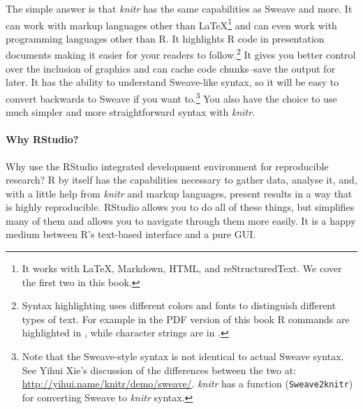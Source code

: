 \documentclass[krantz1]{krantz}
\begin{document}
The simple answer is that {\emph{knitr}} has the same capabilities as Sweave and more. It can work with markup languages other than LaTeX\footnote{It works with LaTeX, Markdown, HTML, and reStructuredText. We cover the first two in this book.} and can even work with programming languages other than R. It highlights R code in presentation documents making it easier for your readers to follow.\footnote{Syntax highlighting uses different colors and fonts to distinguish different types of text. For example in the PDF version of this book R commands are highlighted in , while character strings are in .} It gives you better control over the inclusion of graphics and can cache code chunks--save the output for later. It has the ability to understand Sweave-like syntax, so it will be easy to convert backwards to Sweave if you want to.\footnote{Note that the Sweave-style syntax is not identical to actual Sweave syntax. See Yihui Xie's discussion of the differences between the two at: \url{http://yihui.name/knitr/demo/sweave/}. \emph{knitr} has a function (\texttt{Sweave2knitr}) for converting Sweave to \emph{knitr} syntax.} You also have the choice to use much simpler and more straightforward syntax with {\emph{knitr}}. 

\paragraph{Why RStudio?}

Why use the RStudio integrated development environment for reproducible research? R by itself has the capabilities necessary to gather data, analyse it, and, with a little help from {\emph{knitr}} and markup languages, present results in a way that is highly reproducible. RStudio allows you to do all of these things, but simplifies many of them and allows you to navigate through them more easily. It is a happy medium between R's text-based interface and a pure GUI. 
\end{document}
